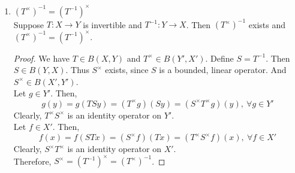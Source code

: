 \begin{remark}
\begin{enumerate}
\begin{proof}
\begin{align*}
		& = \alpha (T^\times g)(x)
	\end{align*}
	\end{proof}
	\item $(T^\times)^{-1} = (T^{-1})^\times$\\
		Suppose $T : X \to Y$ is invertible and $T^{-1} : Y \to X$.
		Then $(T^\times)^{-1}$ exists and $(T^\times)^{-1} = (T^{-1})^\times$.
	\begin{proof}
		We have $T \in B(X,Y)$ and $T^\times \in B(Y',X')$.
		Define $S = T^{-1}$.
		Then $S \in B(Y,X)$.
		Thus $S^\times$ exists, since $S$ is a bounded, linear operator.
		And $S^\times \in B(X',Y')$.\\

		Let $g \in Y'$.
		Then,
		\[ g(y) = g(TSy) = (T^\times g)(Sy) = (S^\times T^\times g)(y),\ \forall g \in Y' \]
		Clearly, $T^\times S^\times$ is an identity operator on $Y'$.\\

		Let $f \in X'$.
		Then,
		\[ f(x) = f(STx) = (S^\times f)(Tx) = (T^\times S^\times f)(x),\ \forall f \in X' \]
		Clearly, $S^\times T^\times$ is an identity operator on $X'$.\\

		Therefore, $S^\times = (T^{-1})^\times = (T^\times)^{-1}$.
	\end{proof}
\end{enumerate}
\end{remark}

